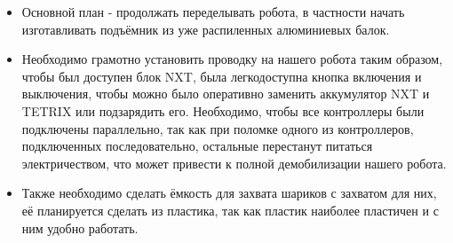 \begin{enumerate}
    \begin{itemize}
    	\item Основной план - продолжать переделывать робота, в частности начать изготавливать подъёмник из уже распиленных алюминиевых балок.
	\item Необходимо грамотно установить проводку на нашего робота таким образом, чтобы был доступен блок NXT, была легкодоступна кнопка включения и выключения, чтобы можно было оперативно заменить аккумулятор NXT и TETRIX или подзарядить его. Необходимо, чтобы все контроллеры были подключены параллельно, так как при поломке одного из контроллеров, подключенных последовательно, остальные перестанут питаться электричеством, что может привести к полной демобилизации нашего робота.
    	\item Также необходимо сделать ёмкость для захвата шариков с захватом для них, её планируется сделать из пластика, так как пластик наиболее пластичен и с ним удобно работать.
    \end{itemize}
   \end{enumerate}
\fillpage
		